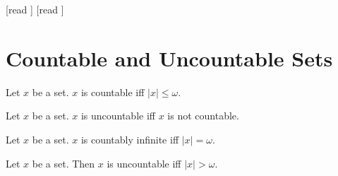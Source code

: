 \documentclass[10pt]{article}
\begin{document}
  \begin{imports}
    \begin{forthel}
      [read ]
      [read ]
    \end{forthel}
  \end{imports}


  \section*{Countable and Uncountable Sets}

  \begin{forthel}
    \begin{definition}[id=SET_THEORY_07_8808604616359936,printid]
      Let $x$ be a set.
      $x$ is countable iff $|x| \leq \omega$.
    \end{definition}
  \end{forthel}

  \begin{forthel}
    \begin{definition}[id=SET_THEORY_07_2935263915409408,printid]
      Let $x$ be a set.
      $x$ is uncountable iff $x$ is not countable.
    \end{definition}
  \end{forthel}

  \begin{forthel}
    \begin{definition}[id=SET_THEORY_07_5679866426949632,printid]
      Let $x$ be a set.
      $x$ is countably infinite iff $|x| = \omega$.
    \end{definition}
  \end{forthel}

  \begin{forthel}
    \begin{proposition}[id=SET_THEORY_07_4281623468048384,printid]
      Let $x$ be a set.
      Then $x$ is uncountable iff $|x| > \omega$.
    \end{proposition}
  \end{forthel}
\end{document}
